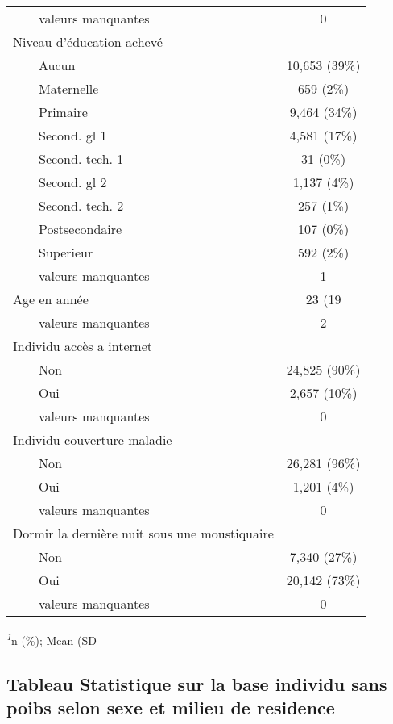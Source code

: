 \documentclass[
]{article}
\begin{document}
\begin{table}[!t]
\begin{tabular*}{\linewidth}{@{\extracolsep{\fill}}lc}
    valeurs manquantes & 0 \\ 
Niveau d'éducation achevé &  \\ 
    Aucun & 10,653 (39\%) \\ 
    Maternelle & 659 (2\%) \\ 
    Primaire & 9,464 (34\%) \\ 
    Second. gl 1 & 4,581 (17\%) \\ 
    Second. tech. 1 & 31 (0\%) \\ 
    Second. gl 2 & 1,137 (4\%) \\ 
    Second. tech. 2 & 257 (1\%) \\ 
    Postsecondaire & 107 (0\%) \\ 
    Superieur & 592 (2\%) \\ 
    valeurs manquantes & 1 \\ 
Age en année & 23 (19 \\ 
    valeurs manquantes & 2 \\ 
Individu accès a internet &  \\ 
    Non & 24,825 (90\%) \\ 
    Oui & 2,657 (10\%) \\ 
    valeurs manquantes & 0 \\ 
Individu couverture maladie &  \\ 
    Non & 26,281 (96\%) \\ 
    Oui & 1,201 (4\%) \\ 
    valeurs manquantes & 0 \\ 
Dormir la dernière nuit sous une moustiquaire &  \\ 
    Non & 7,340 (27\%) \\ 
    Oui & 20,142 (73\%) \\ 
    valeurs manquantes & 0 \\ 
\bottomrule
\end{tabular*}
\begin{minipage}{\linewidth}
\textsuperscript{\textit{1}}n (\%); Mean (SD\\
\end{minipage}
\end{table}

\subsection{Tableau Statistique sur la base individu sans poibs selon
sexe et milieu de
residence}\label{tableau-statistique-sur-la-base-individu-sans-poibs-selon-sexe-et-milieu-de-residence}
\end{document}
